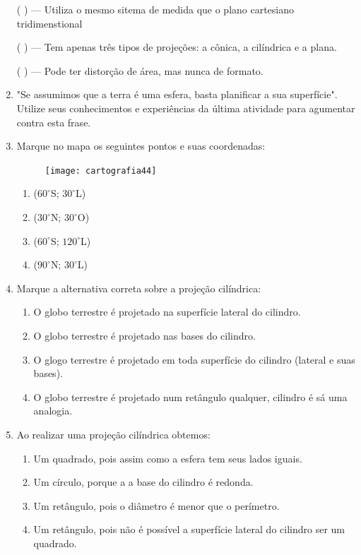 \begin{enumerate}
({ }{ }{ }) --- Utiliza o mesmo sitema de medida que o plano cartesiano tridimenstional

({ }{ }{ }) --- Tem apenas três tipos de projeções: a cônica, a cilíndrica e a plana.

({ }{ }{ }) --- Pode ter distorção de área, mas nunca de formato.

\item "Se assumimos que a terra é uma esfera, basta planificar a sua superfície". Utilize seus conhecimentos e experiências da última atividade para agumentar contra esta frase.

\item Marque no mapa os seguintes pontos e suas coordenadas:

\begin{figure}[H]
\centering
\texttt{[image: cartografia44]}

\end{figure}

\begin{enumerate}
\item ($60^{\circ}$S; $30^{\circ}$L)
\item ($30^{\circ}$N; $30^{\circ}$O)
\item ($60^{\circ}$S; $120^{\circ}$L)
\item ($90^{\circ}$N; $30^{\circ}$L)
\end{enumerate}

\item Marque a alternativa correta sobre a projeção cilíndrica:
\begin{enumerate}
\item O globo terrestre é projetado na superfície lateral do cilindro.
\item O globo terrestre é projetado nas bases do cilindro.
\item O glogo terrestre é projetado em toda superfície do cilindro (lateral e suas bases).
\item O globo terrestre é projetado num retângulo qualquer, cilindro é sá uma analogia.
\end{enumerate}

\item Ao realizar uma projeção cilíndrica obtemos:
\begin{enumerate}
\item Um quadrado, pois assim como a esfera tem seus lados iguais.
\item Um círculo, porque a a base do cilindro é redonda.
\item Um retângulo, pois o diâmetro é menor que o perímetro.
\item Um retângulo, pois não é possível a superfície lateral do cilindro ser um quadrado.
\end{enumerate}


\end{enumerate}
